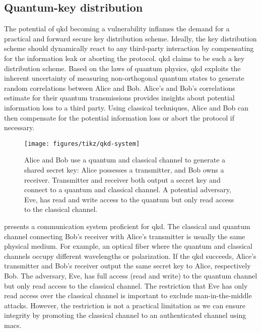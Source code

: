 \FloatBarrier
\subsection{Quantum-key distribution}

The potential of \gls{qkd} becoming a vulnerability inflames the demand for a practical and forward secure key distribution scheme.
Ideally, the key distribution scheme should dynamically react to any third-party interaction by compensating for the information leak or aborting the protocol.
\gls{qkd} claims to be such a key distribution scheme.
Based on the laws of quantum physics, \gls{qkd} exploits the inherent uncertainty of measuring non-orthogonal quantum states to generate random correlations between Alice and Bob.
Alice's and Bob's correlations estimate for their quantum transmissions provides insights about potential information loss to a third party.
Using classical techniques, Alice and Bob can then compensate for the potential information loss or abort the protocol if necessary.
\begin{figure}[htb]
	\centering
	\texttt{[image: figures/tikz/qkd-system]}
	\caption{Alice and Bob use a quantum and classical channel to generate a shared secret key: Alice possesses a transmitter, and Bob owns a receiver. Transmitter and receiver both output a secret key and connect to a quantum and classical channel. A potential adversary, Eve, has read and write access to the quantum but only read access to the classical channel.}\label{fig:qkd_system}
\end{figure}
 presents a communication system proficient for \gls{qkd}.
The classical and quantum channel connecting Bob's receiver with Alice's transmitter is usually the same physical medium.
For example, an optical fiber where the quantum and classical channels occupy different wavelengths or polarization.
If the \gls{qkd} succeeds, Alice's transmitter and Bob's receiver output the same secret key to Alice, respectively Bob.
The adversary, Eve, has full access (read and write) to the quantum channel but only read access to the classical channel.
The restriction that Eve has only read access over the classical channel is important to exclude man-in-the-middle attacks.
However, the restriction is not a practical limitation as we can ensure integrity by promoting the classical channel to an authenticated channel using \gls{mac}s.

